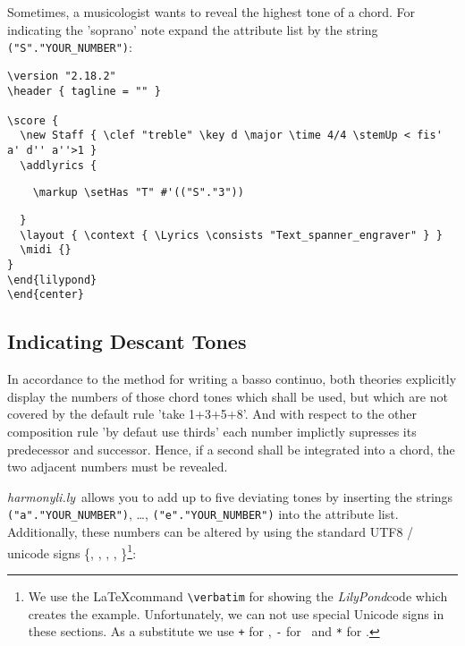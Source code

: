 \documentclass[
  DIV=calc,
  BCOR=5mm,
  12pt,
  headings=small,
  oneside,
  abstract=true,
  toc=bib,
  xcolor=dvipsnames,
  openany,
  ngerman,english]{scrartcl}
\newcommand{\hlyn}[0]{\textit{harmonyli.ly}}
\newcommand{\lily}[0]{\textit{LilyPond}}
\begin{document}
Sometimes, a musicologist wants to reveal the highest tone of a chord. For
indicating the 'soprano' note expand the attribute list by the
string \texttt{("S"."YOUR\_NUMBER")}:
\begin{center}
\end{center}

\begin{scriptsize}
\begin{verbatim}
\version "2.18.2"
\header { tagline = "" }

\score {
  \new Staff { \clef "treble" \key d \major \time 4/4 \stemUp < fis' a' d'' a''>1 }
  \addlyrics { 
\end{verbatim}
{ \color{red} \verb|    \markup \setHas "T" #'(("S"."3"))| }
\begin{verbatim}    
  }
  \layout { \context { \Lyrics \consists "Text_spanner_engraver" } }
  \midi {}
}
\end{lilypond}
\end{center}
\end{verbatim}
\end{scriptsize}

\subsection{Indicating Descant Tones}

In accordance to the method for writing a basso continuo, both theories
explicitly display the numbers of those chord tones which shall be used, but
which are not covered by the default rule 'take 1+3+5+8'. And with respect to
the other composition rule 'by defaut use thirds' each number implictly
supresses its predecessor and successor. Hence, if a second shall be
integrated into a chord, the two adjacent numbers must be revealed.

\hlyn\ allows you to add up to five deviating tones by inserting the strings
\texttt{("a"."YOUR\_NUMBER")}, \ldots, \texttt{("e"."YOUR\_NUMBER")} into the
attribute list. Additionally, these numbers can be altered by using the standard
UTF8 / unicode signs \{\musDoubleFlat , \musFlat , \musNatural , \musSharp ,
\musDoubleSharp \}\footnote{We use the \LaTeX command
 \texttt{\textbackslash verbatim} for showing the \lily code which creates the
 example. Unfortunately, we can not use special Unicode signs in these sections.
As a substitute we use \texttt{+} for \musSharp, \texttt{-} for \musFlat\ and 
 \texttt{*} for \musNatural. }:
\end{document}
